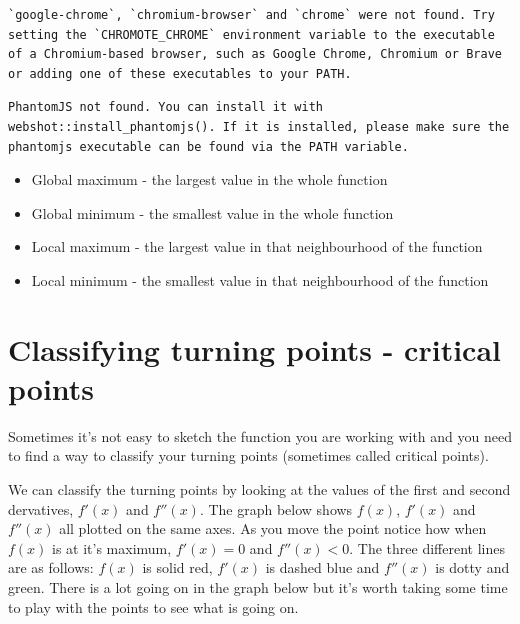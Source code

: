 \documentclass[
  a4paper,
]{scrbook}
\providecommand{\tightlist}{%
  \setlength{\itemsep}{0pt}\setlength{\parskip}{0pt}}
\begin{document}
\begin{verbatim}
`google-chrome`, `chromium-browser` and `chrome` were not found. Try setting the `CHROMOTE_CHROME` environment variable to the executable of a Chromium-based browser, such as Google Chrome, Chromium or Brave or adding one of these executables to your PATH.
\end{verbatim}

\begin{verbatim}
PhantomJS not found. You can install it with webshot::install_phantomjs(). If it is installed, please make sure the phantomjs executable can be found via the PATH variable.
\end{verbatim}

\begin{tcolorbox}[enhanced jigsaw, arc=.35mm, bottomrule=.15mm, bottomtitle=1mm, breakable, colback=white, colbacktitle=quarto-callout-note-color!10!white, colframe=quarto-callout-note-color-frame, coltitle=black, left=2mm, leftrule=.75mm, opacityback=0, opacitybacktitle=0.6, rightrule=.15mm, title=\textcolor{quarto-callout-note-color}{\faInfo}\hspace{0.5em}{Names of turning points}, titlerule=0mm, toprule=.15mm, toptitle=1mm]

\begin{itemize}
\tightlist
\item
  Global maximum - the largest value in the whole function
\item
  Global minimum - the smallest value in the whole function
\item
  Local maximum - the largest value in that neighbourhood of the
  function
\item
  Local minimum - the smallest value in that neighbourhood of the
  function
\end{itemize}

\end{tcolorbox}

\section{Classifying turning points - critical
points}\label{classifying-turning-points---critical-points}

Sometimes it's not easy to sketch the function you are working with and
you need to find a way to classify your turning points (sometimes called
critical points).

We can classify the turning points by looking at the values of the first
and second dervatives, \(f'(x)\) and \(f''(x)\). The graph below shows
\(f(x)\), \(f'(x)\) and \(f''(x)\) all plotted on the same axes. As you
move the point notice how when \(f(x)\) is at it's maximum,
\(f'(x) = 0\) and \(f''(x) < 0\). The three different lines are as
follows: \(f(x)\) is solid red, \(f'(x)\) is dashed blue and \(f''(x)\)
is dotty and green. There is a lot going on in the graph below but it's
worth taking some time to play with the points to see what is going on.
\end{document}
